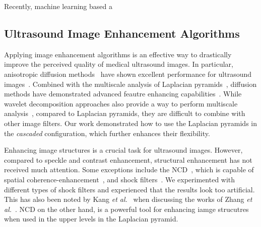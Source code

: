 Recently,
machine learning based a


\subsection{Ultrasound Image Enhancement Algorithms}
Applying image enhancement algorithms is an effective way to drastically improve the perceived quality of medical ultrasound images.
In particular, anisotropic diffusion methods~\cite{perona_scalespace_1990, weickert_anisotropic_1998} have shown excellent performance for ultrasound images~\cite{yongjianyu_speckle_2002, abd-elmoniem_realtime_2002, aja-fernandez_estimation_2006, krissian_oriented_2007, vegas-sanchez-ferrero_probabilisticdriven_2010, ramos-llorden_anisotropic_2015, mishra_edge_2018}.
Combined with the multiscale analysis of Laplacian pyramids~\cite{burt_laplacian_1983}, diffusion methods have demonstrated advanced feautre enhancing capabilities~\cite{zhang_multiscale_2006, zhang_nonlinear_2007, kang_new_2016}.
While wavelet decomposition approaches also provide a way to perform multiscale analysis~\cite{xulizong_speckle_1998, xiaohuihao_novel_1999, pizurica_versatile_2003, yongyue_nonlinear_2006}, compared to Laplacian pyramids, they are difficult to combine with other image filters.
Our work demonstrated how to use the Laplacian pyramids in the \textit{cascaded} configuration, which further enhances their flexibility.

Enhancing image structures is a crucial task for ultrasound images.
However, compared to speckle and contrast enhancement, structural enhancement has not received much attention.
Some exceptions include the NCD~\cite{abd-elmoniem_realtime_2002}, which is capable of spatial coherence-enhancement~\cite{weickert_coherenceenhancing_1999}, and shock filters~\cite{zhang_multiscale_2006, kang_new_2016}.
We experimented with different types of shock filters and experienced that the results look too artificial.
This has also been noted by Kang \textit{et al.}~\cite{kang_new_2016} when discussing the works of Zhang \textit{et al.}~\cite{zhang_multiscale_2006}.
NCD on the other hand, is a powerful tool for enhancing iamge strucutres when used in the upper levels in the Laplacian pyramid.

